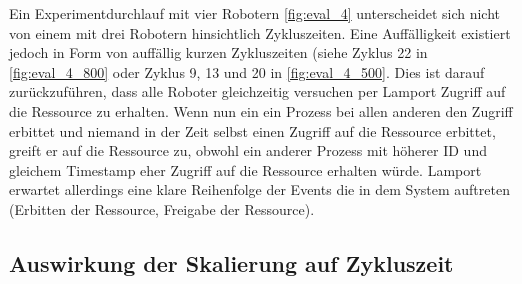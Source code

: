 Ein Experimentdurchlauf mit vier Robotern \ref{fig:eval_4} unterscheidet sich nicht von einem mit drei Robotern
hinsichtlich Zykluszeiten. Eine Auffälligkeit existiert jedoch in Form von auffällig kurzen Zykluszeiten (siehe
Zyklus 22 in \ref{fig:eval_4_800} oder Zyklus 9, 13 und 20 in \ref{fig:eval_4_500}. Dies ist darauf zurückzuführen,
dass alle Roboter gleichzeitig versuchen per Lamport Zugriff auf die Ressource zu erhalten. Wenn nun ein ein 
Prozess bei allen anderen den Zugriff erbittet und niemand in der Zeit selbst einen Zugriff auf die Ressource
erbittet, greift er auf die Ressource zu, obwohl ein anderer Prozess mit höherer ID und gleichem
Timestamp eher Zugriff auf die Ressource erhalten würde. Lamport erwartet allerdings eine klare Reihenfolge der
Events die in dem System auftreten \citep{lamport} (Erbitten der Ressource, Freigabe der Ressource).

\clearpage

\subsection{Auswirkung der Skalierung auf Zykluszeit}

